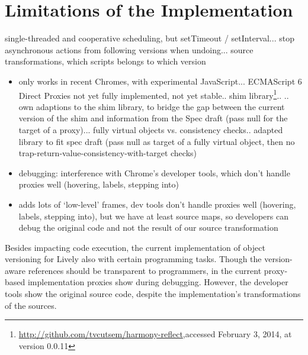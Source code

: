 \section{Limitations of the Implementation}




single-threaded and cooperative scheduling, but setTimeout / setInterval... stop asynchronous actions from following versions when undoing... source transformations, which scripts belongs to which version



\begin{itemize}
    \item only works in recent Chromes, with experimental JavaScript... ECMAScript 6 Direct Proxies not yet fully implemented, not yet stable.. shim library\footnote{\url{http://github.com/tvcutsem/harmony-reflect},\goodbreak accessed February 3, 2014, at version 0.0.11}..
.. own adaptions to the shim library, to bridge the gap between the current version of the shim and information from the Spec draft (pass null for the target of a proxy)... fully virtual objects vs. consistency checks.. adapted library to fit spec draft (pass null as target of a fully virtual object, then no trap-return-value-consistency-with-target checks)
\end{itemize}
    


\begin{itemize}
    \item debugging: interference with Chrome's developer tools, which don’t handle proxies well (hovering, labels, stepping into)
\end{itemize}



\begin{itemize}
    \item adds lots of ‘low-level’ frames, dev tools don’t handle proxies well (hovering, labels, stepping into), but we have at least source maps, so developers can debug the original code and not the result of our source transformation
\end{itemize}


Besides impacting code execution, the current implementation of object versioning for Lively also  with certain programming tasks.
Though the version-aware references should be transparent to programmers, in the current proxy-based implementation proxies show during debugging.
However, the developer tools show the original source code, despite the implementation's transformations of the sources.
